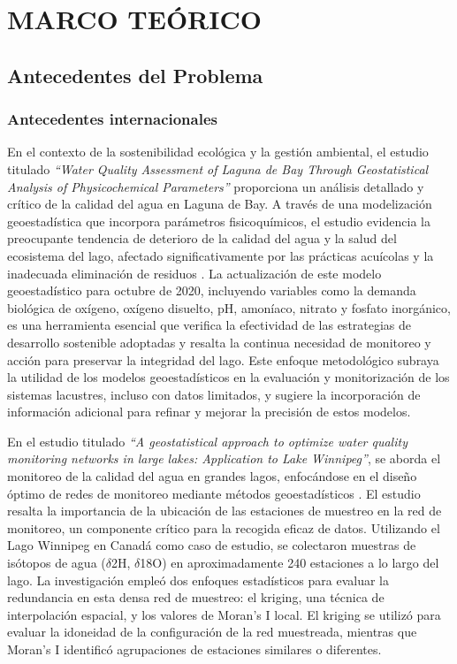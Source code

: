 \chapter{MARCO TEÓRICO}

\section{Antecedentes del Problema}

\subsection{Antecedentes internacionales}
En el contexto de la sostenibilidad ecológica y la gestión ambiental, el estudio titulado \textit{``Water Quality Assessment of Laguna de Bay Through Geostatistical Analysis of Physicochemical Parameters''} proporciona un análisis detallado y crítico de la calidad del agua en Laguna de Bay. A través de una modelización geoestadística que incorpora parámetros fisicoquímicos, el estudio evidencia la preocupante tendencia de deterioro de la calidad del agua y la salud del ecosistema del lago, afectado significativamente por las prácticas acuícolas y la inadecuada eliminación de residuos \cite{Bernal2022}. La actualización de este modelo geoestadístico para octubre de 2020, incluyendo variables como la demanda biológica de oxígeno, oxígeno disuelto, pH, amoníaco, nitrato y fosfato inorgánico, es una herramienta esencial que verifica la efectividad de las estrategias de desarrollo sostenible adoptadas y resalta la continua necesidad de monitoreo y acción para preservar la integridad del lago. Este enfoque metodológico subraya la utilidad de los modelos geoestadísticos en la evaluación y monitorización de los sistemas lacustres, incluso con datos limitados, y sugiere la incorporación de información adicional para refinar y mejorar la precisión de estos modelos. 

En el estudio titulado \textit{``A geostatistical approach to optimize water quality monitoring networks in large lakes: Application to Lake Winnipeg''}, se aborda el monitoreo de la calidad del agua en grandes lagos, enfocándose en el diseño óptimo de redes de monitoreo mediante métodos geoestadísticos \cite{Beveridge2012}. El estudio resalta la importancia de la ubicación de las estaciones de muestreo en la red de monitoreo, un componente crítico para la recogida eficaz de datos. Utilizando el Lago Winnipeg en Canadá como caso de estudio, se colectaron muestras de isótopos de agua ($\delta$2H, $\delta$18O) en aproximadamente 240 estaciones a lo largo del lago. La investigación empleó dos enfoques estadísticos para evaluar la redundancia en esta densa red de muestreo: el kriging, una técnica de interpolación espacial, y los valores de Moran's I local. El kriging se utilizó para evaluar la idoneidad de la configuración de la red muestreada, mientras que Moran's I identificó agrupaciones de estaciones similares o diferentes.

